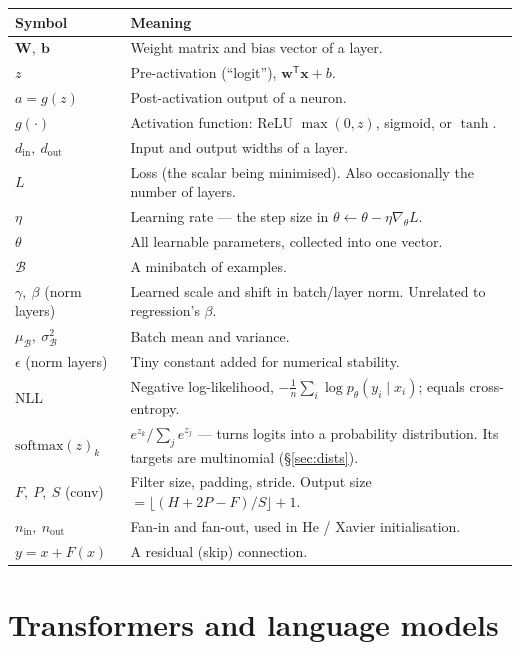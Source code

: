 \documentclass[10pt,letterpaper,onecolumn]{article}
\makeatletter
\newenvironment{symtab}
  {\begin{longtable}{@{}>{\raggedright\arraybackslash}p{0.26\textwidth}%
                       >{\raggedright\arraybackslash}p{0.70\textwidth}@{}}
   \toprule
   \textbf{Symbol} & \textbf{Meaning} \\
   \midrule
   \endhead
   \bottomrule
   \endfoot}
  {\end{longtable}}
\newcommand{\T}{\mathsf{T}}
\makeatother
\begin{document}
\begin{symtab}
$\mathbf{W},\ \mathbf{b}$ & Weight matrix and bias vector of a layer. \\
$z$ & Pre-activation (``logit''), $\mathbf{w}^{\T}\mathbf{x}+b$. \\
$a = g(z)$ & Post-activation output of a neuron. \\
$g(\cdot)$ & Activation function: ReLU $\max(0,z)$, sigmoid, or $\tanh$. \\
$d_{\text{in}},\ d_{\text{out}}$ & Input and output widths of a layer. \\
$L$ & Loss (the scalar being minimised). Also occasionally the number of layers. \\
$\eta$ & Learning rate — the step size in $\theta \leftarrow \theta - \eta\nabla_\theta L$. \\
$\theta$ & All learnable parameters, collected into one vector. \\
$\mathcal{B}$ & A minibatch of examples. \\
$\gamma,\ \beta$ (norm layers) & Learned scale and shift in batch/layer norm. Unrelated to regression's $\beta$. \\
$\mu_{\mathcal{B}},\ \sigma^2_{\mathcal{B}}$ & Batch mean and variance. \\
$\epsilon$ (norm layers) & Tiny constant added for numerical stability. \\
NLL & Negative log-likelihood, $-\frac{1}{n}\sum_i \log p_\theta(y_i \mid x_i)$; equals cross-entropy. \\
$\mathrm{softmax}(z)_k$ & $e^{z_k}/\sum_j e^{z_j}$ — turns logits into a probability distribution. Its targets are multinomial (\S\ref{sec:dists}). \\
$F,\ P,\ S$ (conv) & Filter size, padding, stride. Output size $=\lfloor (H+2P-F)/S \rfloor + 1$. \\
$n_{\text{in}},\ n_{\text{out}}$ & Fan-in and fan-out, used in He / Xavier initialisation. \\
$y = x + F(x)$ & A residual (skip) connection. \\
\end{symtab}

\section{Transformers and language models}
\end{document}
